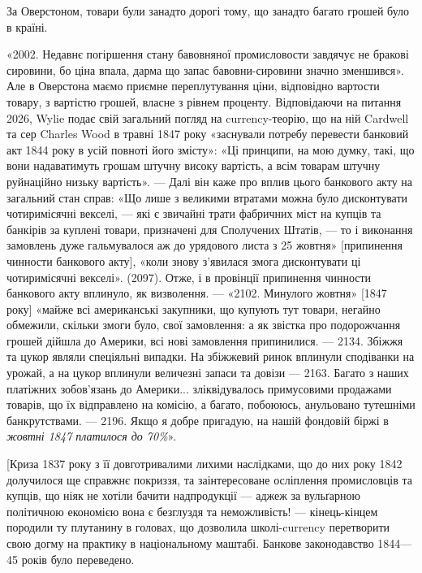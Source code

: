 За Оверстоном, товари були занадто дорогі тому, що занадто багато грошей
було в країні.

«2002. Недавнє погіршення стану бавовняної промисловости завдячує не
бракові сировини, бо ціна впала, дарма що запас бавовни-сировини значно
зменшився». Але в Оверстона маємо приємне переплутування ціни, відповідно
вартости товару, з вартістю грошей, власне з рівнем проценту. Відповідаючи на
питання 2026, Wylie подає свій загальний погляд на currency-теорію, що на
ній Cardwell та сер Charles Wood в травні 1847 року «заснували потребу перевести
банковий акт 1844 року в усій повноті його змісту»: «Ці принципи, на
мою думку, такі, що вони надаватимуть грошам штучну високу вартість, а всім
товарам штучну руйнаційно низьку вартість». — Далі він каже про вплив цього
банкового акту на загальний стан справ: «Що лише з великими втратами можна
було дисконтувати чотиримісячні векселі, — які є звичайні трати фабричних міст
на купців та банкірів за куплені товари, призначені для Сполучених Штатів, —
то і виконання замовлень дуже гальмувалося аж до урядового листа з 25 жовтня»
[припинення чинности банкового акту], «коли знову з’явилася змога дисконтувати
ці чотиримісячні векселі». (2097). Отже, і в провінції припинення чинности
банкового акту вплинуло, як визволення. — «2102. Минулого жовтня»
[1847 року] «майже всі американські закупники, що купують тут товари, негайно
обмежили, скільки змоги було, свої замовлення: а як звістка про подорожчання
грошей дійшла до Америки, всі нові замовлення припинилися. — 2134.
Збіжжя та цукор являли спеціяльні випадки. На збіжжевий ринок вплинули
сподіванки на урожай, а на цукор вплинули величезні запаси та довізи — 2163.
Багато з наших платіжних зобов’язань до Америки... зліквідувалось примусовими
продажами товарів, що їх відправлено на комісію, а багато, побоююсь,
анульовано тутешніми банкрутствами. — 2196. Якщо я добре пригадую, на нашій
фондовій біржі в \emph{жовтні 1847 платилося до 70\%}».

[Криза 1837 року з її довготривалими лихими наслідками, що до них
року 1842 долучилося ще справжнє покриззя, та заінтересоване осліплення
промисловців та купців, що ніяк не хотіли бачити надпродукції — аджеж за
вульґарною політичною економією вона є безглуздя та неможливість! — кінець-кінцем
породили ту плутанину в головах, що дозволила школі-currency перетворити
свою догму на практику в національному маштабі. Банкове законодавство
1844—45 років було переведено.

